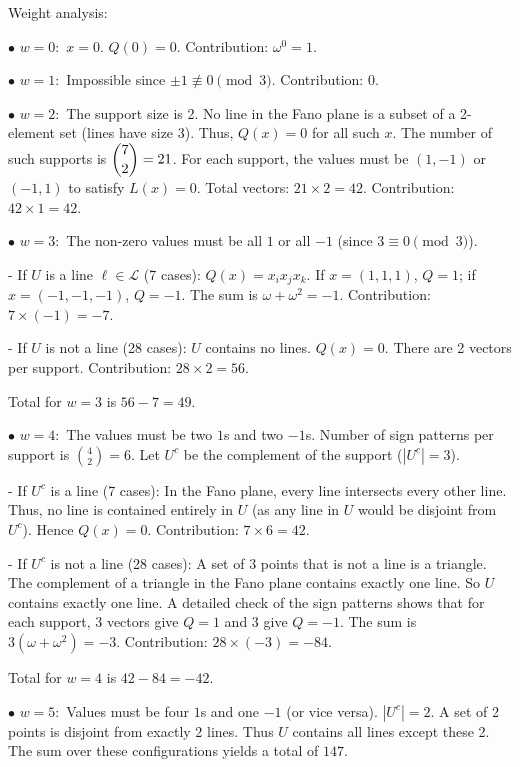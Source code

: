 \begin{enumerate}
 Weight analysis:

 $\bullet$ $w = 0:$ $x=0$. $Q(0)=0$. Contribution: $\omega^0 = 1$. 

 $\bullet$ $w = 1:$ Impossible since $\pm 1 \not\equiv 0 \pmod 3$. Contribution: $0$. 

 $\bullet$ $w = 2:$ The support size is 2. No line in the Fano plane is a subset of a 2-element set (lines have size 3). Thus, $Q(x)=0$ for all such $x$. The number of such supports is $\dbinom{7}{2}=21$. For each support, the values must be $(1, -1)$ or $(-1, 1)$ to satisfy $L(x)=0$. Total vectors: $21 \times 2 = 42$. Contribution: $42 \times 1 = 42$. 

 $\bullet$ $w = 3:$ The non-zero values must be all $1$ or all $-1$ (since $3 \equiv 0 \pmod 3$). 

 - If $U$ is a line $\ell \in \mathcal{L}$ (7 cases): $Q(x) = x_i x_j x_k$. If $x=(1,1,1)$, $Q=1$; if $x=(-1,-1,-1)$, $Q=-1$. The sum is $\omega + \omega^2 = -1$. Contribution: $7 \times (-1) = -7$. 

 - If $U$ is not a line (28 cases): $U$ contains no lines. $Q(x)=0$. There are 2 vectors per support. Contribution: $28 \times 2 = 56$.

 Total for $w=3$ is $56 - 7 = 49$. 

 $\bullet$ $w = 4:$ The values must be two $1$s and two $-1$s. Number of sign patterns per support is $\binom{4}{2}=6$. Let $U^c$ be the complement of the support ($|U^c|=3$). 

 - If $U^c$ is a line (7 cases): In the Fano plane, every line intersects every other line. Thus, no line is contained entirely in $U$ (as any line in $U$ would be disjoint from $U^c$). Hence $Q(x)=0$. Contribution: $7 \times 6 = 42$. 

 - If $U^c$ is not a line (28 cases): A set of 3 points that is not a line is a triangle. The complement of a triangle in the Fano plane contains exactly one line. So $U$ contains exactly one line. A detailed check of the sign patterns shows that for each support, 3 vectors give $Q=1$ and 3 give $Q=-1$. The sum is $3(\omega + \omega^2) = -3$. Contribution: $28 \times (-3) = -84$. 

 Total for $w=4$ is $42 - 84 = -42$. 

 $\bullet$ $w = 5:$ Values must be four $1$s and one $-1$ (or vice versa). $|U^c|=2$. A set of 2 points is disjoint from exactly 2 lines. Thus $U$ contains all lines except these 2. The sum over these configurations yields a total of $147$. 


\end{enumerate}
